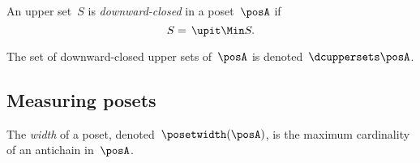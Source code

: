 \begin{comment}
    \item \emph{Transitivity}: One has
    \begin{equation}
      \begin{aligned}
        \left(A\posAAleq B\right) \wedge \left(B\posAAleq C\right)&\Leftrightarrow  \left(\upit  A \supseteq \ \upit  \ B\right) \wedge \left( \upit   B\supseteq \ \upit  C\right)\\
        &\Imp \ \upit  A\supseteq \ \upit  C\\
        &\Imp A\posAAleq C.
      \end{aligned}
    \end{equation}
    In order to find the top, we need to find the smallest set~$\postop_{\posAA}$ such that~$A\posAAleq \postop_{\posAA}$ for all~$A\in \posAA$.
    In other words, such that~$\upit  A\supseteq \ \upit  \postop_{\posAA}$ for all~$A\in \posAA$. This is clearly~$\emptyset$, since~$\upit  \emptyset = \emptyset$.
    Similarly, in order to find the bottom, we need to find the set~$\posbot_{\posAA}$ such that~$\posbot_{\posAA} \posAAleq A$ for all~$A\in \posAA$.
    In other words, such that~$\upit  \posbot_{\posAA} \supseteq \ \upit  A$ for all~$A\in \posAA$.
    We obtain a bottom if we set~$\posbot_{\posAA} \definedas \postop_{\posA}$, since~$\postop_{\posA} \supseteq A$ for all~$A \subseteq P$, and hence, by monotonicity of~$\upit $, we have in particular~$\upit  \postop_{\posA} \supseteq \upit  A$ for all antichains~$A$.
  \end{compactitem}
\end{proof}
\end{comment}

\begin{definition}
  \label{def:downward-closed-upperset}
  An upper set~$S$ is \emph{downward-closed} in a poset~$\posA$ if
  \begin{equation}
    S =\, \upit  \Min S.
  \end{equation}
\end{definition}

The set of downward-closed upper sets of~$\posA$ is denoted~$\dcuppersets \posA$.

\subsection{Measuring posets}
\begin{definition}
  \label{def:poset-width}
  The \emph{width} of a poset, denoted~$\posetwidth(\posA)$, is the maximum cardinality of an antichain in~$\posA$.
\end{definition}

